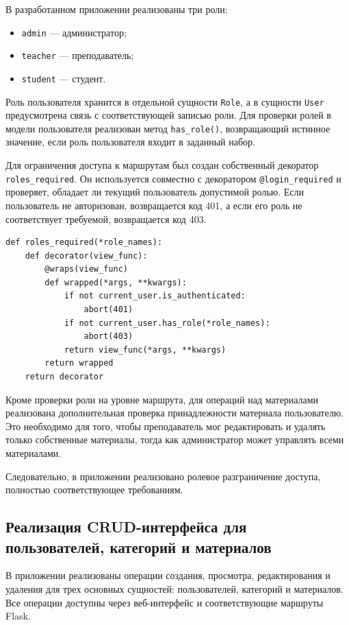 В разработанном приложении реализованы три роли:

\begin{itemize}[leftmargin=1.25cm]
    \item \texttt{admin} --- администратор;
    \item \texttt{teacher} --- преподаватель;
    \item \texttt{student} --- студент.
\end{itemize}

Роль пользователя хранится в отдельной сущности \texttt{Role}, а в сущности \texttt{User} предусмотрена связь с соответствующей записью роли. Для проверки ролей в модели пользователя реализован метод \texttt{has\_role()}, возвращающий истинное значение, если роль пользователя входит в заданный набор.

Для ограничения доступа к маршрутам был создан собственный декоратор \texttt{roles\_required}. Он используется совместно с декоратором \texttt{@login\_required} и проверяет, обладает ли текущий пользователь допустимой ролью. Если пользователь не авторизован, возвращается код 401, а если его роль не соответствует требуемой, возвращается код 403.

\begin{lstlisting}
def roles_required(*role_names):
    def decorator(view_func):
        @wraps(view_func)
        def wrapped(*args, **kwargs):
            if not current_user.is_authenticated:
                abort(401)
            if not current_user.has_role(*role_names):
                abort(403)
            return view_func(*args, **kwargs)
        return wrapped
    return decorator
\end{lstlisting}

Кроме проверки роли на уровне маршрута, для операций над материалами реализована дополнительная проверка принадлежности материала пользователю. Это необходимо для того, чтобы преподаватель мог редактировать и удалять только собственные материалы, тогда как администратор может управлять всеми материалами.

Следовательно, в приложении реализовано ролевое разграничение доступа, полностью соответствующее требованиям.

\subsection{Реализация CRUD-интерфейса для пользователей, категорий и материалов}

В приложении реализованы операции создания, просмотра, редактирования и удаления для трех основных сущностей: пользователей, категорий и материалов. Все операции доступны через веб-интерфейс и соответствующие маршруты Flask.


